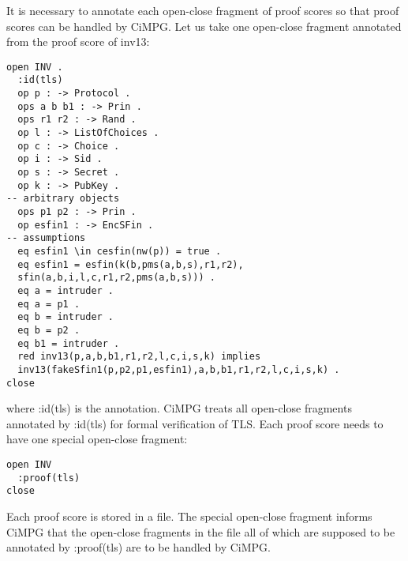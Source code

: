 \documentclass[a4paper,fleqn]{cas-dc}
\begin{document}
It is necessary to annotate each open-close fragment of proof
scores so that proof scores can be handled by CiMPG. Let us take
one open-close fragment annotated from the proof score of inv13:
\begin{small}
\begin{verbatim}
open INV .
  :id(tls)
  op p : -> Protocol .
  ops a b b1 : -> Prin .
  ops r1 r2 : -> Rand .
  op l : -> ListOfChoices .
  op c : -> Choice .
  op i : -> Sid .
  op s : -> Secret .
  op k : -> PubKey .
-- arbitrary objects
  ops p1 p2 : -> Prin .
  op esfin1 : -> EncSFin .
-- assumptions
  eq esfin1 \in cesfin(nw(p)) = true .
  eq esfin1 = esfin(k(b,pms(a,b,s),r1,r2),
  sfin(a,b,i,l,c,r1,r2,pms(a,b,s))) .
  eq a = intruder .
  eq a = p1 .
  eq b = intruder .
  eq b = p2 .
  eq b1 = intruder . 
  red inv13(p,a,b,b1,r1,r2,l,c,i,s,k) implies
  inv13(fakeSfin1(p,p2,p1,esfin1),a,b,b1,r1,r2,l,c,i,s,k) .
close
\end{verbatim}
\end{small}
where :id(tls) is the annotation. CiMPG treats all open-close fragments annotated by :id(tls) for formal verification of TLS. Each proof score needs to have one special open-close fragment:
\begin{small}
\begin{verbatim}
open INV
  :proof(tls)
close
\end{verbatim}
\end{small}
Each proof score is stored in a file. The special open-close
fragment informs CiMPG that the open-close fragments in the file
all of which are supposed to be annotated by :proof(tls) are to
be handled by CiMPG.
\end{document}
